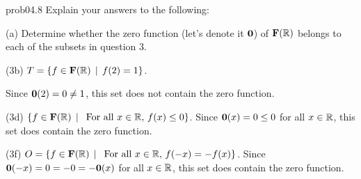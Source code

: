 \begin{sol}{prob04.8} Explain your answers to the following:

\medskip
(a)  Determine whether the  zero function (let's denote it ${\bf 0}$) of $\mathbf{F}(\mathbb{R})$ belongs to each of the subsets in  question 3. \medskip

 
 (3b) $T=\{f \in \mathbf{F}(\mathbb{R}) \,\mid \, f(2)=1  \}$. 

\soln Since ${\bf 0}(2)=0\not=1$, this set does not contain the zero function.

\medskip

 (3d) $\{f \in \mathbf{F}(\mathbb{R}) \,\mid \, \text{ For all } x\in \mathbb{R},   \, f(x)\le 0 \}$. Since ${\bf 0}(x) = 0 \le 0$ for all $x\in \mathbb{R}$, this set does contain the zero function.

\medskip

 (3f) $O=\{f \in \mathbf{F}(\mathbb{R}) \,\mid \, \text{ For all } x\in \mathbb{R},   \, f(-x)= -f(x) \}$. Since ${\bf 0}(-x) = 0=-0=-{\bf 0}(x)  $ for all $x\in \mathbb{R}$, this set does contain the zero function.

\medskip
 

\end{sol} 


